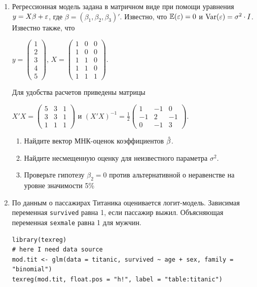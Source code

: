 \documentclass[12pt, a4paper]{article}
\begin{document}
\begin{enumerate}
\item Регрессионная модель  задана в матричном виде при помощи уравнения $y=X\beta+\varepsilon$, где $\beta=(\beta_1,\beta_2,\beta_3)'$.
Известно, что $\mathbb{E}(\varepsilon)=0$  и  $\operatorname{Var}(\varepsilon)=\sigma^2\cdot I$.
Известно также, что

$y=\left(
\begin{array}{c}
1\\
2\\
3\\
4\\
5
\end{array}\right)$,
$X=\left(\begin{array}{ccc}
1 & 0 & 0 \\
1 & 0 & 0 \\
1 & 1 & 0 \\
1 & 1 & 0 \\
1 & 1 & 1
\end{array}\right)$.


Для удобства расчетов приведены матрицы


$X'X=\left(
\begin{array}{ccc}
5 & 3 & 1\\
3 & 3 & 1\\
1 & 1 & 1
\end{array}\right)$ и $(X'X)^{-1}=\frac{1}{2}\left(
\begin{array}{ccc}
1 & -1 & 0 \\
-1 & 2 & -1 \\
0 & -1 & 3
\end{array}\right)$.

\begin{enumerate}
\item Найдите вектор МНК-оценок коэффициентов $\hat{\beta}$.
\item Найдите несмещенную оценку для неизвестного параметра $\sigma^2$.
\item Проверьте гипотезу $\beta_2=0$ против альтернативной о неравенстве на уровне значимости 5\%

\end{enumerate}




\item По данным о пассажирах Титаника оценивается логит-модель. Зависимая переменная \verb|survived| равна 1, если пассажир выжил. Объясняющая переменная \verb|sexmale| равна 1 для  мужчин.

\begin{verbatim}
library(texreg)
# here I need data source
mod.tit <- glm(data = titanic, survived ~ age + sex, family = "binomial")
texreg(mod.tit, float.pos = "h!", label = "table:titanic")
\end{verbatim}



\end{enumerate}
\end{document}
